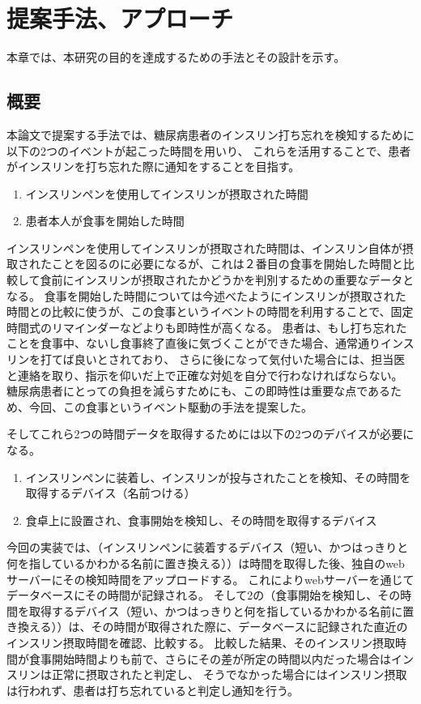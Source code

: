 \chapter{提案手法、アプローチ}
\label{chap:design}

本章では、本研究の目的を達成するための手法とその設計を示す。

\section{概要}

本論文で提案する手法では、糖尿病患者のインスリン打ち忘れを検知するために以下の2つのイベントが起こった時間を用いり、
これらを活用することで、患者がインスリンを打ち忘れた際に通知をすることを目指す。

\begin{enumerate}
  \item インスリンペンを使用してインスリンが摂取された時間
  \item 患者本人が食事を開始した時間
\end{enumerate}

インスリンペンを使用してインスリンが摂取された時間は、インスリン自体が摂取されたことを図るのに必要になるが、これは２番目の食事を開始した時間と比較して食前にインスリンが摂取されたかどうかを判別するための重要なデータとなる。
食事を開始した時間については今述べたようにインスリンが摂取された時間との比較に使うが、この食事というイベントの時間を利用することで、固定時間式のリマインダーなどよりも即時性が高くなる。
患者は、もし打ち忘れたことを食事中、ないし食事終了直後に気づくことができた場合、通常通りインスリンを打てば良いとされており、\cite{insulin_qa_sakaemachi_nishi} \cite{insulin_qa_akaike}
さらに後になって気付いた場合には、担当医と連絡を取り、指示を仰いだ上で正確な対処を自分で行わなければならない。\cite{insulin_qa_senior}
糖尿病患者にとっての負担を減らすためにも、この即時性は重要な点であるため、今回、この食事というイベント駆動の手法を提案した。

そしてこれら2つの時間データを取得するためには以下の2つのデバイスが必要になる。

\begin{enumerate}
  \item インスリンペンに装着し、インスリンが投与されたことを検知、その時間を取得するデバイス（名前つける）
  \item 食卓上に設置され、食事開始を検知し、その時間を取得するデバイス
\end{enumerate}

今回の実装では、（インスリンペンに装着するデバイス（短い、かつはっきりと何を指しているかわかる名前に置き換える））は時間を取得した後、独自のwebサーバーにその検知時間をアップロードする。
これによりwebサーバーを通じてデータベースにその時間が記録される。
そして2の（食事開始を検知し、その時間を取得するデバイス（短い、かつはっきりと何を指しているかわかる名前に置き換える））は、その時間が取得された際に、データベースに記録された直近のインスリン摂取時間を確認、比較する。
比較した結果、そのインスリン摂取時間が食事開始時間よりも前で、さらにその差が所定の時間以内だった場合はインスリンは正常に摂取されたと判定し、
そうでなかった場合にはインスリン摂取は行われず、患者は打ち忘れていると判定し通知を行う。

